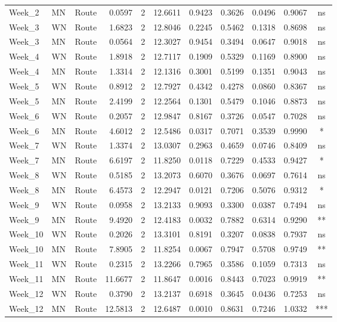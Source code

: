 \documentclass[
  12pt,
  letterpaper,
]{article}
\begin{document}
\begin{longtable}{lllrrrlrrrc}
Week\_2 & MN & Route & 0.0597 & 2 & 12.6611 & 0.9423 & 0.3626 & 0.0496 & 0.9067 & ns \\ 
Week\_3 & WN & Route & 1.6823 & 2 & 12.8046 & 0.2245 & 0.5462 & 0.1318 & 0.8698 & ns \\ 
Week\_3 & MN & Route & 0.0564 & 2 & 12.3027 & 0.9454 & 0.3494 & 0.0647 & 0.9018 & ns \\ 
Week\_4 & WN & Route & 1.8918 & 2 & 12.7117 & 0.1909 & 0.5329 & 0.1169 & 0.8900 & ns \\ 
Week\_4 & MN & Route & 1.3314 & 2 & 12.1316 & 0.3001 & 0.5199 & 0.1351 & 0.9043 & ns \\ 
Week\_5 & WN & Route & 0.8912 & 2 & 12.7927 & 0.4342 & 0.4278 & 0.0860 & 0.8367 & ns \\ 
Week\_5 & MN & Route & 2.4199 & 2 & 12.2564 & 0.1301 & 0.5479 & 0.1046 & 0.8873 & ns \\ 
Week\_6 & WN & Route & 0.2057 & 2 & 12.9847 & 0.8167 & 0.3726 & 0.0547 & 0.7028 & ns \\ 
Week\_6 & MN & Route & 4.6012 & 2 & 12.5486 & 0.0317 & 0.7071 & 0.3539 & 0.9990 & * \\ 
Week\_7 & WN & Route & 1.3374 & 2 & 13.0307 & 0.2963 & 0.4659 & 0.0746 & 0.8409 & ns \\ 
Week\_7 & MN & Route & 6.6197 & 2 & 11.8250 & 0.0118 & 0.7229 & 0.4533 & 0.9427 & * \\ 
Week\_8 & WN & Route & 0.5185 & 2 & 13.2073 & 0.6070 & 0.3676 & 0.0697 & 0.7614 & ns \\ 
Week\_8 & MN & Route & 6.4573 & 2 & 12.2947 & 0.0121 & 0.7206 & 0.5076 & 0.9312 & * \\ 
Week\_9 & WN & Route & 0.0958 & 2 & 13.2133 & 0.9093 & 0.3300 & 0.0387 & 0.7494 & ns \\ 
Week\_9 & MN & Route & 9.4920 & 2 & 12.4183 & 0.0032 & 0.7882 & 0.6314 & 0.9290 & ** \\ 
Week\_10 & WN & Route & 0.2026 & 2 & 13.3101 & 0.8191 & 0.3207 & 0.0838 & 0.7937 & ns \\ 
Week\_10 & MN & Route & 7.8905 & 2 & 11.8254 & 0.0067 & 0.7947 & 0.5708 & 0.9749 & ** \\ 
Week\_11 & WN & Route & 0.2315 & 2 & 13.2266 & 0.7965 & 0.3586 & 0.1059 & 0.7313 & ns \\ 
Week\_11 & MN & Route & 11.6677 & 2 & 11.8647 & 0.0016 & 0.8443 & 0.7023 & 0.9919 & ** \\ 
Week\_12 & WN & Route & 0.3790 & 2 & 13.2137 & 0.6918 & 0.3645 & 0.0436 & 0.7253 & ns \\ 
Week\_12 & MN & Route & 12.5813 & 2 & 12.6487 & 0.0010 & 0.8631 & 0.7246 & 1.0332 & *** \\ 

\end{longtable}
\end{document}
